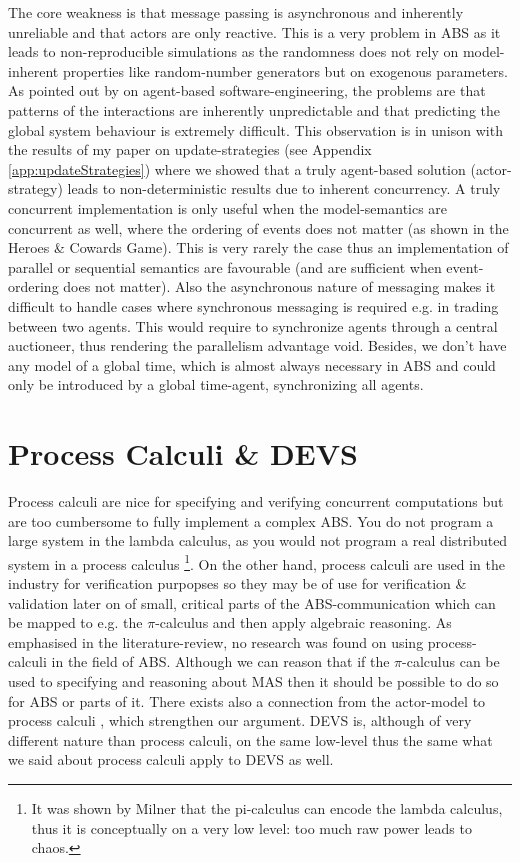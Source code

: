 The core weakness is that message passing is asynchronous and inherently unreliable and that actors are only reactive. This is a very problem in ABS as it leads to non-reproducible simulations as the randomness does not rely on model-inherent properties like random-number generators but on exogenous parameters. As pointed out by \cite{jennings_agent-based_2000} on agent-based software-engineering, the problems are that patterns of the interactions are inherently unpredictable and that predicting the global system behaviour is extremely difficult. This observation is in unison with the results of my paper on update-strategies (see Appendix \ref{app:updateStrategies}) where we showed that a truly agent-based solution (actor-strategy) leads to non-deterministic results due to inherent concurrency. A truly concurrent implementation is only useful when the model-semantics are concurrent as well, where the ordering of events does not matter (as shown in the Heroes \& Cowards Game). This is very rarely the case thus an implementation of parallel or sequential semantics are favourable (and are sufficient when event-ordering does not matter).
Also the asynchronous nature of messaging makes it difficult to handle cases where synchronous messaging is required e.g. in trading between two agents. This would require to synchronize agents through a central auctioneer, thus rendering the parallelism advantage void. Besides, we don't have any model of a global time, which is almost always necessary in ABS and could only be introduced by a global time-agent, synchronizing all agents.

\section{Process Calculi \& DEVS}
Process calculi are nice for specifying and verifying concurrent computations but are too cumbersome to fully implement a complex ABS. You do not program a large system in the lambda calculus, as you would not program a real distributed system in a process calculus \footnote{It was shown by Milner \cite{milner_elements_1993} that the pi-calculus can encode the lambda calculus, thus it is conceptually on a very low level: too much raw power leads to chaos.}. On the other hand, process calculi are used in the industry for verification purpopses so they may be of use for verification \& validation later on of small, critical parts of the ABS-communication which can be mapped to e.g. the $\pi$-calculus and then apply algebraic reasoning. As emphasised in the literature-review, no research was found on using process-calculi in the field of ABS. Although we can reason that if the $\pi$-calculus can be used to specifying and reasoning about MAS then it should be possible to do so for ABS or parts of it. There exists also a connection from the actor-model to process calculi \cite{agha_foundation_1997}, which strengthen our argument. 
DEVS is, although of very different nature than process calculi, on the same low-level thus the same what we said about process calculi apply to DEVS as well.

